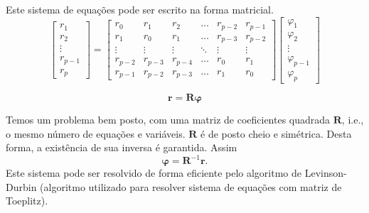 \begin{frame}[allowframebreaks]
  \framebreak
  Este sistema de equações pode ser escrito na forma matricial.
  \begin{equation}
  \begin{bmatrix}r_1 \\ r_2 \\ \vdots \\ r_{p-1} \\ r_p \end{bmatrix} = 
  \begin{bmatrix} 
  r_0 & r_1 & r_2 & \ldots & r_{p-2} & r_{p-1} \\  
  r_1 & r_0 & r_1 & \ldots & r_{p-3} & r_{p-2} \\ 
  \vdots & \vdots & \vdots & \ddots & \vdots & \vdots  \\ 
  r_{p-2} & r_{p-3} & r_{p-4} & \ldots & r_0 & r_1 \\ 
  r_{p-1} & r_{p-2} & r_{p-3} & \ldots & r_1 & r_0 
  \end{bmatrix}
  \begin{bmatrix}\varphi_1 \\ \varphi_2 \\ \vdots \\ \varphi_{p-1} \\ \varphi_p \end{bmatrix}
  \end{equation}
  
  \begin{equation}
        \mathbf{r} = \mathbf{R} \mathbf{\varphi} 
  \end{equation}
  
  Temos um problema bem posto, com uma matriz de coeficientes quadrada
  $\mathbf{R}$, i.e., o mesmo número de equações e variáveis.
  $\mathbf{R}$ é de posto cheio e simétrica. Desta forma, a existência
  de sua inversa é garantida. Assim
  \begin{equation}
        \mathbf{\varphi} = \mathbf{R}^{-1}\mathbf{r} .
  \end{equation}
  Este sistema pode ser resolvido de forma eficiente pelo algoritmo
  de Levinson-Durbin (algoritmo utilizado para resolver sistema de equações
  com matriz de Toeplitz).
  
\end{frame}


